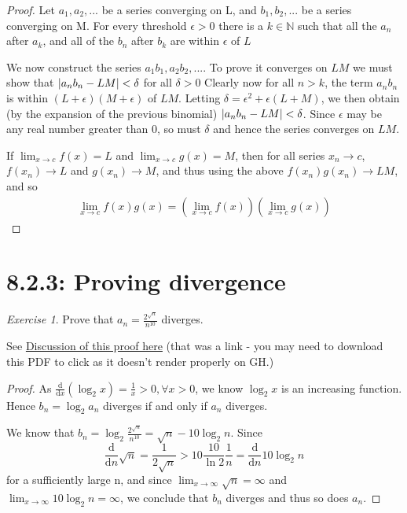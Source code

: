 \documentclass{article}
\DeclarePairedDelimiter\abs{\lvert}{\rvert}%
\theoremstyle{remark}
\newtheorem*{exercise}{Exercise}
\begin{document}
\begin{proof}
Let $a_1, a_2,...$ be a series converging on L, and $b_1, b_2,...$ be a series converging on M. For every threshold $\epsilon > 0$ there is a $k \in \mathbb{N}$ such that all the $a_n$ after $a_k$, and all of the $b_n$ after $b_k$ are within $\epsilon$ of $L$

We now construct the series $a_1b_1,a_2b_2,...$. To prove it converges on $LM$ we must show that $\abs{a_nb_n - LM} < \delta$ for all $\delta > 0$ Clearly now for all $n>k$, the term $a_nb_n$ is within $(L+\epsilon)(M+\epsilon)$ of $LM$. Letting $\delta = \epsilon^2+\epsilon(L+M)$, we then obtain (by the expansion of the previous binomial) $\abs{a_nb_n - LM} < \delta$. Since $\epsilon$ may be any real number greater than 0, so must $\delta$ and hence the series converges on $LM$.

If $\lim_{x \to c} f(x) = L$ and $\lim_{x \to c} g(x) = M$, then for all series $x_n \rightarrow c$, $f(x_n) \rightarrow L$ and $g(x_n) \rightarrow M$, and thus using the above $f(x_n)g(x_n) \rightarrow LM$, and so
\[
\begin{aligned}
\lim_{x \to c} f(x)g(x) = (\lim_{x \to c} f(x))(\lim_{x \to c} g(x))
\end{aligned}
\]
\end{proof}

\section*{8.2.3: Proving divergence}
\begin{exercise}
Prove that $a_n = \frac{2^{\sqrt{n}}}{n^{10}}$ diverges.
\end{exercise}

See \href{https://github.com/pim-book/exercises/issues/4}{Discussion of this proof here} (that was a link - you may need to download this PDF to click as it doesn't render properly on GH.)
\begin{proof}
As $\frac{\mathrm{d}}{\mathrm{d}x}(\log_2 x) = \frac{1}{x} > 0,\forall x > 0$, we know $\log_2 x$ is an increasing function. Hence $b_n = \log_2 a_n$ diverges if and only if $a_n$ diverges.

We know that $b_n = \log_2 \frac{2^{\sqrt{n}}}{n^{10}} = \sqrt{n} - 10 \log_2 n$.
Since
\[
\frac{\mathrm{d}}{\mathrm{d}n} \sqrt{n} = \frac{1}{2 \sqrt{n} } > 10 \frac{10}{\ln 2} \frac{1}{n} = \frac{\mathrm{d}}{\mathrm{d}n} 10 \log_2 n
\]
for a sufficiently large n, and since $\lim_{x \to \infty} \sqrt{n} = \infty$ and $\lim_{x \to \infty} 10 \log_2{n} = \infty$, we conclude that $b_n$ diverges and thus so does $a_n$.
\end{proof}
\end{document}
